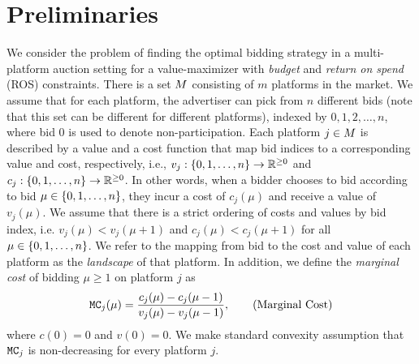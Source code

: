\section{Preliminaries}
We consider the problem of finding the optimal bidding strategy in a multi-platform auction setting for a value-maximizer with \emph{budget} and \emph{return on spend} (ROS) constraints. There is a set $M$ consisting of $m$ platforms in the market.
We assume that for each platform, the advertiser can pick from $n$ different bids (note that this set can be different for different platforms), indexed by $0,1,2,\dots,n$, where bid $0$ is used to denote non-participation.
Each platform $j \in M$ is described by a value and a cost function that map {bid indices} to a corresponding value and cost, respectively, i.e., $v_j:\{0,1,\dots,n\} \rightarrow \mathbb{R}^{\geq 0}$ and $c_j: \{0,1,\dots,n\} \rightarrow \mathbb{R}^{\geq 0}$. In other words, when a bidder chooses to bid according to bid $\mu \in \{0,1,\dots,n\}$, they incur a cost of $c_j(\mu)$ and receive a value of $v_j(\mu)$.
We assume that there is a strict ordering of costs and values by bid index, i.e. $v_j(\mu) < v_j(\mu+1)$ and $c_j(\mu) < c_j(\mu+1)$ for all $\mu \in \{0,1,\dots,n\}$. 
We refer to the mapping from bid to the cost and value of each platform as the \emph{landscape} of that platform. 
In addition, we define the \emph{marginal cost} of bidding $\mu\geq 1$ on platform $j$ as
\begin{align}\label{eq:marginalcost}
    \texttt{MC}_j(\mu) = \frac{c_j(\mu)-c_j(\mu-1)}{v_j(\mu)-v_j(\mu-1)}, \tag{Marginal Cost}
\end{align}
where $c(0)=0$ and $v(0)=0$.
We make standard convexity assumption that $\texttt{MC}_j$ is non-decreasing for every platform $j$. 

